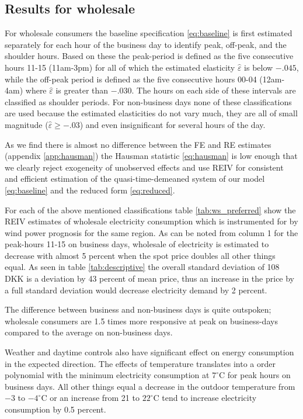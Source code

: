 \label{sec:results}
\subsection{Results for wholesale}
\label{subsec:r_wholesale}
For wholesale consumers the baseline specification \eqref{eq:baseline} is first estimated separately for each hour of the business day to identify peak, off-peak, and the shoulder hours. Based on these the peak-period is defined as the five consecutive hours 11-15 (11am-3pm) for all of which the estimated elasticity $\widehat{\varepsilon}$ is below $-.045$, while the off-peak period is defined as the five consecutive hours 00-04 (12am-4am) where $\widehat{\varepsilon}$ is greater than $-.030$. The hours on each side of these intervals are classified as shoulder periods. For non-business days none of these classifications are used because the estimated elasticities do not vary much, they are all of small magnitude ($\widehat{\varepsilon}\geq-.03$)  and even insignificant for several hours of the day.
\bigskip\par
As we find there is almost no difference between the FE and RE estimates (appendix \ref{app:hausman}) the Hausman statistic \eqref{eq:hausman} is low enough that we clearly reject exogeneity of unobserved effects and use REIV for consistent and efficient estimation of the quasi-time-demeaned system of our model \eqref{eq:baseline} and the reduced form \eqref{eq:reduced}.
\bigskip\par
For each of the above mentioned classifications table \ref{tab:ws_preferred} show the REIV estimates of wholesale electricity consumption which is instrumented for by wind power prognosis for the same region. As can be noted from column 1 for the peak-hours 11-15 on business days, wholesale of electricity is estimated to decrease with almost 5 percent when the spot price doubles all other things equal. As seen in table \ref{tab:descriptive} the overall standard deviation of 108 DKK is a deviation by 43 percent of mean price, thus an increase in the price by a full standard deviation would decrease electricity demand by 2 percent.
\par
The difference between business and non-business days is quite outspoken; wholesale consumers are 1.5 times more responsive at peak on business-days compared to the average on non-business days.
\par
Weather and daytime controls also have significant effect on energy consumption in the expected direction. The effects of temperature translates into a  order polynomial with the minimum electricity consumption at $7^{\circ}$C for peak hours on business days. All other things equal a decrease in the outdoor temperature from $-3$ to $-4^{\circ}$C or an increase from 21 to $22^{\circ}$C tend to increase electricity consumption by 0.5 percent.

